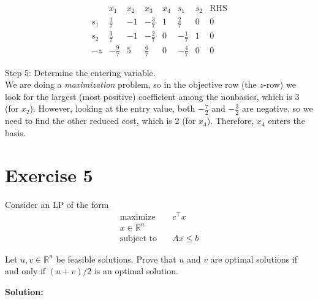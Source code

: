\documentclass{article}
\begin{document}
\[
\begin{array}{c|cccccc|c}
  & x_1 & x_2 & x_3 & x_4 & s_1 & s_2 & \text{RHS}\\\hline
s_1 & \tfrac17 & -1 & -\tfrac37 & 1 & \tfrac27 & 0 & 0\\
s_2 & \tfrac37 & -1 & -\tfrac27 & 0 & -\tfrac17 & 1 & 0\\\hline
-z   & -\tfrac97       & 5         & \tfrac{6}{7}         & 0        & -\tfrac{4}{7} & 0 & 0
\end{array}
\]

Step 5: Determine the entering variable. \\

We are doing a \emph{maximization} problem, so in the objective row (the \(z\)-row) we look for the largest (most positive) coefficient among the nonbasics, which is \(3\) (for \(x_2\)).  However, looking at the entry value, both $-\frac{7}{2}$ and $-\frac{3}{2}$ are negative, so we need to find the other reduced cost, which is 2 (for \(x_4\)).  Therefore, \(x_4\) enters the basis.

\newpage

\section*{Exercise 5}
Consider an LP of the form
\begin{align*}
\text{maximize} \quad & c^\top x \\
x \in \mathbb{R}^n \\
\text{subject to} \quad & Ax \leq b
\end{align*}

Let $u, v \in \mathbb{R}^n$ be feasible solutions. Prove that $u$ and $v$ are optimal solutions if and only if $(u + v)/2$ is an optimal solution.

\textbf{Solution: }
\end{document}
